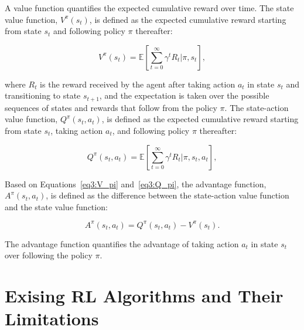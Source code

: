 A value function quantifies the expected cumulative reward over time.
The state value function, $V^{\pi}(s_t)$, is defined as the expected cumulative reward starting from state $s_t$ and following policy $\pi$ thereafter:

\begin{equation} \label{eq3:V_pi}
    V^{\pi}(s_t) = \mathbb{E} \left[ \sum_{t=0}^{\infty} \gamma^t R_t |\pi, s_t \right],
\end{equation}

where $R_t$ is the reward received by the agent after taking action $a_t$ in state $s_t$ and transitioning to state $s_{t+1}$, and the expectation is taken over the possible sequences of states and rewards that follow from the policy $\pi$.
The state-action value function, $Q^{\pi}(s_t, a_t)$, is defined as the expected cumulative reward starting from state $s_t$, taking action $a_t$, and following policy $\pi$ thereafter:

\begin{equation} \label{eq3:Q_pi}
    Q^{\pi}(s_t, a_t) = \mathbb{E} \left[ \sum_{t=0}^{\infty} \gamma^t R_t |\pi, s_t, a_t \right],
\end{equation}

Based on Equations~\ref{eq3:V_pi} and~\ref{eq3:Q_pi}, the advantage function, $A^{\pi}(s_t, a_t)$, is defined as the difference between the state-action value function and the state value function:

\begin{equation} \label{eq3:A_pi}
    A^{\pi}(s_t, a_t) = Q^{\pi}(s_t, a_t) - V^{\pi}(s_t).
\end{equation}

The advantage function quantifies the advantage of taking action $a_t$ in state $s_t$ over following the policy $\pi$.

\section{Exising RL Algorithms and Their Limitations} \label{sec:RLAlgorithms}


